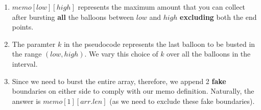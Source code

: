 \documentclass[12pt]{article}
\begin{document}
\begin{algorithm}
\begin{algorithmic}[1]
\begin{enumerate}
    \item $memo[low][high]$ represents the maximum amount that you can collect after bursting \textbf{all} the balloons between $low$ and $high$ \textbf{excluding} both the end points.
    \item The paramter $k$ in the pseudocode represents the last balloon to be busted in the range $(low, high)$. We vary this choice of $k$ over all the balloons in the interval.
    
    \item Since we need to burst the entire array, therefore, we append 2 \textbf{fake} boundaries on either side to comply with our memo definition. Naturally, the answer is $memo[1][arr.len]$ (as we need to exclude these fake boundaries).
\end{enumerate}


  \end{algorithmic}
  
\end{algorithm}
\end{document}
